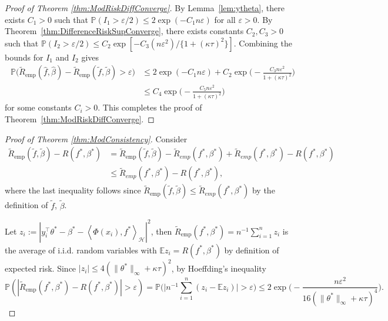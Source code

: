 \documentclass[twoside, onecolumn]{article}
\def\varep{\varepsilon}
\def\Hcal{\mathcal{H}}
\def\Hcal{\mathcal{H}}
\begin{document}
\begin{proof}[Proof of Theorem \ref{thm:ModRiskDiffConverge}]
By Lemma~\ref{lem:ytheta}, there exists $C_1>0$ such that $\mathbb{P}(I_1>\varep/2)\leq 2\exp(-C_1 n \varepsilon)$ for all $\varep>0.$ By Theorem~\ref{thm:DifferenceRiskSupConverge}, there exists constants $C_2, C_3>0$ such that $\mathbb{P}(I_2>\varep/2)\leq C_2 \exp[-C_3 (n \varepsilon^2)/\{1+(\kappa\tau)^2\}].$ Combining the bounds for $I_1$ and $I_2$ gives
\begin{align*}
\mathbb{P}\Big(\widetilde{R}_{\text{emp}}(\widehat{f}, \widehat{\beta})-\widetilde{R}_{\text{emp}}(\widetilde{f}, \widetilde{\beta})>\varep\Big)
&\leq 2\exp(-C_1 n \varepsilon)+C_2 \exp\Big(-\frac{C_3 n \varepsilon^2}{1+(\kappa\tau)^2}\Big)\\
&\leq C_4\exp\Big(-\frac{C_5 n \varepsilon^2}{1+(\kappa\tau)^2}\Big)
\end{align*}
for some constants $C_i>0$.
This completes the proof of Theorem~\ref{thm:ModRiskDiffConverge}.
\end{proof}

\begin{proof}[Proof of Theorem \ref{thm:ModConsistency}]
Consider
\begin{align*}
    \widetilde{R}_{\text{emp}}(\widetilde{f}, \widetilde{\beta})-R(f^\ast, \beta^\ast) &= \widetilde{R}_{\text{emp}}(\widetilde{f}, \widetilde{\beta}) - \widetilde R_{emp}(f^*, \beta^*) + \widetilde R_{emp}(f^*, \beta^*) - R(f^*, \beta^*)\\
    &\leq \widetilde R_{emp}(f^*, \beta^*) - R(f^*, \beta^*),
\end{align*}
where the last inequality follows since $\widetilde{R}_{\text{emp}}(\widetilde{f}, \widetilde{\beta})\leq \widetilde R_{emp}(f^*, \beta^*)$ by the definition of $\widetilde f$, $\widetilde \beta$.

Let $z_{i}:=|y_i^{\top}\theta^*-\beta^\ast-\left<\Phi(x_i),f^\ast\right>_\Hcal|^2$, then $\widetilde{R}_{\text{emp}}(f^\ast, \beta^\ast)=n^{-1}\sum_{i=1}^{n} z_{i}$ is the average of i.i.d. random variables with $\mathbb{E}z_i=R(f^\ast, \beta^\ast)$ by definition of expected risk. Since $|z_i|\leq4(\|\theta^*\|_\infty+\kappa \tau)^{2}$, by Hoeffding's inequality
$$
\mathbb{P}(| \widetilde{R}_{\text{emp}}(f^*, \beta^*)-R(f^*, \beta^*)|>\varepsilon)=\mathbb{P}\Big(\Big|n^{-1}\sum_{i=1}^{n} (z_{i}-\mathbb{E}z_i)\Big|>\varepsilon \Big)\leq 2\exp \Big(-\frac{n \varepsilon^2}{16(\|\theta^*\|_\infty+\kappa \tau)^{4}} \Big).
$$
\end{proof}
\end{document}
